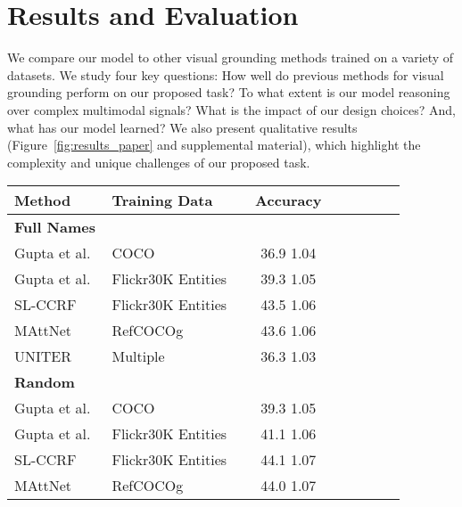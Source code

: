 \section{Results and Evaluation}\label{sec:results}

We compare our model
to other visual grounding methods trained on a variety of datasets. We study four key questions: How well do previous methods for visual grounding perform on our proposed task? To what extent is our model reasoning over complex multimodal signals? What is the impact of our design choices? And, what has our model learned?  
We also present qualitative results (Figure~\ref{fig:results_paper} and supplemental material), which  highlight the complexity and unique challenges of our proposed task.

\begin{table}[t]
  \centering
  \setlength{\tabcolsep}{3.2pt}
  \def\arraystretch{0.95}
  \begin{tabularx}{1.0\columnwidth}{lllcccccc}
    \toprule
    Method                                   & Training Data      &   & Accuracy    \\
    \midrule
    \textbf{Full Names} \\
    Gupta et al.~\cite{gupta2020contrastive} & COCO               &   & 36.9  1.04          \\
    Gupta et al.~\cite{gupta2020contrastive} & Flickr30K Entities &   & 39.3  1.05          \\
    SL-CCRF~\cite{liu2020phrase}             & Flickr30K Entities &   &  43.5  1.06         \\
    MAttNet~\cite{yu2018mattnet}             & RefCOCOg           &   &  43.6  1.06         \\
    UNITER~\cite{chen2020uniter}             & Multiple~\cite{lin2014microsoft,krishna2017visual,ordonez2011im2text,sharma2018conceptual}  &   &  36.3  1.03            \\
    \midrule
    \textbf{Random} \\
    Gupta et al.~\cite{gupta2020contrastive} & COCO               &   &  39.3  1.05         \\
    Gupta et al.~\cite{gupta2020contrastive} & Flickr30K Entities &   &  41.1  1.06          \\
    SL-CCRF~\cite{liu2020phrase}             & Flickr30K Entities &   & 44.1  1.07          \\
    MAttNet~\cite{yu2018mattnet}             & RefCOCOg           &   &  44.0  1.07          \\

\end{tabularx}
\end{table}
